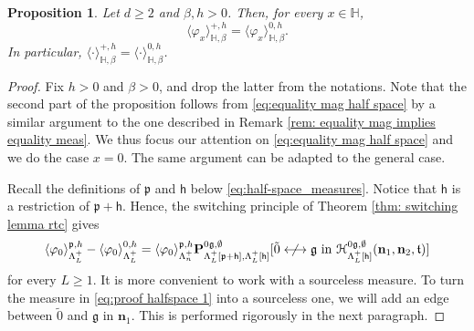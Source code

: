 \documentclass[11pt,a4paper]{article}
\newtheorem{proposition}[theorem]{Proposition}
\theoremstyle{definition}
\numberwithin{equation}{section}
\newcommand\n{\mathbf{n}}
\newcommand\fg{\mathfrak{g}}
\newcommand\ft{\mathfrak{t}}
\begin{document}
\begin{proposition}\label{prop: unique half-space measure} Let $d\geq 2$ and $\beta,h>0$. Then, for every $x \in \mathbb H$,
\begin{equation}\label{eq:equality mag half space}
    \langle \varphi_x\rangle_{\mathbb H,\beta}^{+,h}=\langle \varphi_x\rangle_{\mathbb H,\beta}^{0,h}.
\end{equation}
In particular, $\langle \cdot\rangle^{+,h}_{\mathbb H,\beta}=\langle \cdot\rangle^{0,h}_{\mathbb H,\beta}$.
\end{proposition}


\begin{proof} 
Fix $h>0$ and $\beta>0$, and drop the latter from the notations. Note that the second part of the proposition follows from \eqref{eq:equality mag half space} by a similar argument to the one described in Remark \ref{rem: equality mag implies equality meas}.  We thus focus our attention on \eqref{eq:equality mag half space} and we do the case $x=0$. The same argument can be adapted to the general case.

Recall the definitions of $\mathfrak{p}$ and $\mathsf{h}$ below \eqref{eq:half-space_measures}. 
Notice that $\mathsf{h}$ is a restriction of $\mathfrak{p}+\mathsf{h}$. Hence, the switching principle of Theorem \ref{thm: switching lemma rtc} gives
\begin{equation}\label{eq:proof halfspace 1}
    \langle \varphi_0\rangle_{\Lambda_L^+}^{\mathfrak p,h}-\langle \varphi_0\rangle_{\Lambda_L^+}^{0,h}=\langle \varphi_0\rangle_{\Lambda_n^+}^{\mathfrak{p},h}\mathbf P_{\Lambda_L^+[\mathfrak{p}+\mathsf{h}],\Lambda_L^+[\mathsf{h}]}^{0\fg,\emptyset}[\tilde 0 \centernot\longleftrightarrow \fg \text{ in } \mathcal{H}^{0\fg,\emptyset}_{\Lambda_L^+[\mathsf{h}]}(\n_1,\n_2,\ft)]
\end{equation}
for every $L\geq1$. It is more convenient to work with a sourceless measure. To turn the measure in \eqref{eq:proof halfspace 1} into a sourceless one, we will add an edge between $\tilde{0}$ and $\fg$ in $\n_1$. This is performed rigorously in the next paragraph.


\end{proof}
\end{document}
